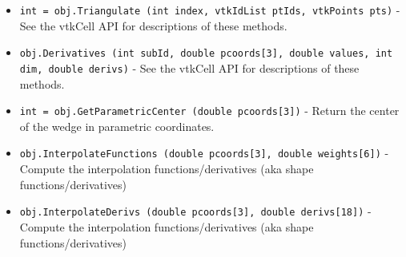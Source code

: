\begin{itemize}
\item  \verb|int = obj.Triangulate (int index, vtkIdList ptIds, vtkPoints pts)| -  See the vtkCell API for descriptions of these methods.

\item  \verb|obj.Derivatives (int subId, double pcoords[3], double values, int dim, double derivs)| -  See the vtkCell API for descriptions of these methods.

\item  \verb|int = obj.GetParametricCenter (double pcoords[3])| -  Return the center of the wedge in parametric coordinates.

\item  \verb|obj.InterpolateFunctions (double pcoords[3], double weights[6])| -  Compute the interpolation functions/derivatives
 (aka shape functions/derivatives)

\item  \verb|obj.InterpolateDerivs (double pcoords[3], double derivs[18])| -  Compute the interpolation functions/derivatives
 (aka shape functions/derivatives)

\end{itemize}
